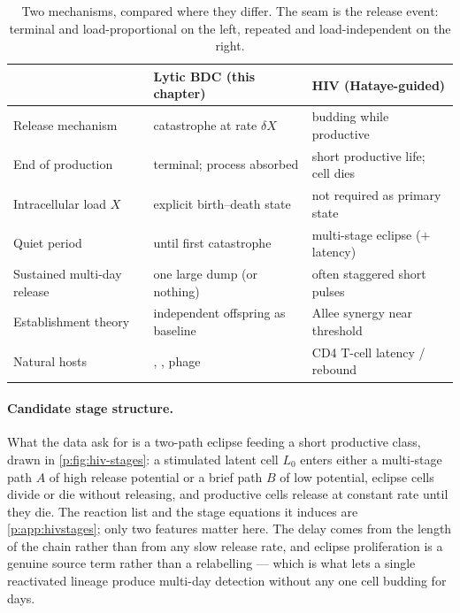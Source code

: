 \begin{table}[htbp]
\centering
\renewcommand{\arraystretch}{1.1}
\small
\begin{tabular}{@{}lll@{}}
\toprule
 & Lytic BDC (this chapter) & HIV (Hataye-guided) \\
\midrule
Release mechanism & catastrophe at rate $\delta X$ & budding while productive \\
End of production & terminal; process absorbed & short productive life; cell dies \\
Intracellular load $X$ & explicit birth--death state & not required as primary state \\
Quiet period & until first catastrophe & multi-stage eclipse ($+$ latency) \\
Sustained multi-day release & one large dump (or nothing) & often staggered short pulses \\
Establishment theory & independent offspring as baseline & Allee synergy near threshold \\
Natural hosts & \yp{}, \ft{}, phage & CD4 T-cell latency / rebound \\
\bottomrule
\end{tabular}
\caption{Two mechanisms, compared where they differ. The seam is the
release event: terminal and load-proportional on the left, repeated and
load-independent on the right.}
\label{p:tab:hiv-contrast}
\end{table}

\paragraph{Candidate stage structure.} What the data ask for is a two-path
eclipse feeding a short productive class, drawn in \cref{p:fig:hiv-stages}:
a stimulated latent cell $L_0$ enters either a multi-stage path $A$ of high
release potential or a brief path $B$ of low potential, eclipse cells divide
or die without releasing, and productive cells release at constant rate
until they die. The reaction list and the stage equations it induces are
\cref{p:app:hivstages}; only two features matter here. The delay comes from
the length of the chain rather than from any slow release rate, and eclipse
proliferation is a genuine source term rather than a relabelling --- which
is what lets a single reactivated lineage produce multi-day detection
without any one cell budding for days.

